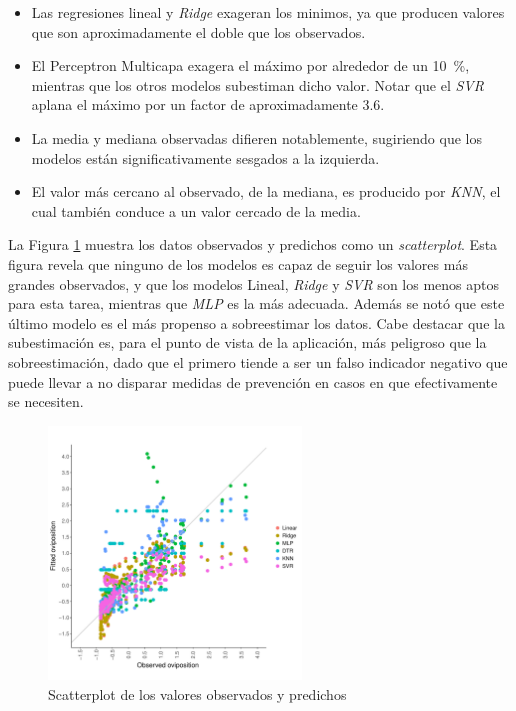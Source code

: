     \begin{itemize}
      \item Las regresiones lineal y \textit{Ridge} exageran los minimos, ya
        que producen valores que son aproximadamente el doble que los observados.
      \item El Perceptron Multicapa exagera el máximo por alrededor de un \SI{10}{\percent},
        mientras que los otros modelos subestiman dicho valor. Notar que el \textit{SVR}
        aplana el máximo por un factor de aproximadamente 3.6.
      \item La media y mediana observadas difieren notablemente, sugiriendo que
        los modelos están significativamente sesgados a la izquierda.
      \item El valor más cercano al observado, de la mediana, es producido por
        \textit{KNN}, el cual también conduce a un valor cercado de la media.

    \end{itemize}


    \par La Figura \ref{fig:scatter} muestra los datos observados y predichos
      como un \textit{scatterplot}. Esta figura revela que ninguno de los modelos
      es capaz de seguir los valores más grandes observados, y que los modelos
      Lineal, \textit{Ridge} y \textit{SVR} son los menos aptos para esta
      tarea, mientras que \textit{MLP} es la más adecuada. Además se notó que
      este último modelo es el más propenso a sobreestimar los datos. Cabe
      destacar que la subestimación es, para el punto de vista de la aplicación,
      más peligroso que la sobreestimación, dado que el primero tiende a
      ser un falso indicador negativo que puede llevar a no disparar medidas
      de prevención en casos en que efectivamente se necesiten.
      \begin{figure}[hbt]
      \centering%
      \includegraphics[width=0.6\textwidth]{images/scatterplot}%
      \caption{Scatterplot de los valores observados y predichos}\label{fig:scatter}
      \end{figure}



